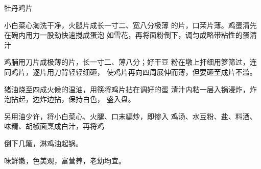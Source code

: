\begin{recipe}{牡丹鸡片}

\ingredients



\cooking

\step 	小白菜心淘洗干净，火腿片成长一寸二、宽八分极薄 的片，口茉片薄。鸡蛋清先在碗内用力一股劲快速搅成蛋泡 如雪花，再将面粉倒下，调匀成略带粘性的蛋清汁

\step 	鸡脯用刀片成极薄的片，长一寸二、薄八分；好干豆 粉在墩上扞细用箩筛过，连同鸡片，逐片用刀背轻轻细砸， 使鸡片再向四周展伸而薄，但要砸至成片不滥。

\step 	猪油烧至四成火候的温油，用筷将鸡片拈在调好的蛋 清汁内粘一层入锅浸炸，炸泡拈起，边炸边拈，保持白色， 盛入盘。

\step 	另用油少许，将小白菜心、火腿、口末編炒，即惨入 鸡汤、水豆粉、盐、料酒、味精、胡椒面烹成白汁，再将鸡

倒下几簸，淋鸡油起锅。

\notes

味鲜嫩，色美观，富营养，老幼均宜。

\end{recipe}

